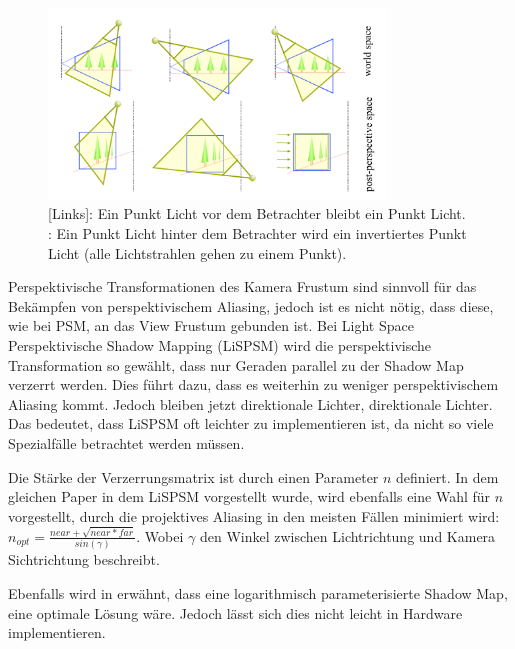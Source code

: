 \begin{figure}
	\begin{center}
    \includegraphics[width=0.8\textwidth]{res/img/psm_point_lights.png}
    \caption{[Links]: Ein Punkt Licht vor dem Betrachter bleibt ein Punkt Licht. \newline
      [Mitte]: Ein Punkt Licht hinter dem Betrachter wird ein
    invertiertes Punkt Licht (alle Lichtstrahlen gehen zu einem Punkt).}
	  \label{fig:psm-point-lights}
	\end{center}
\end{figure}
Perspektivische Transformationen des Kamera Frustum sind sinnvoll für das Bekämpfen von perspektivischem Aliasing,
jedoch ist es nicht nötig, dass diese, wie bei PSM, an das View Frustum gebunden ist.
Bei Light Space Perspektivische Shadow Mapping (LiSPSM) \cite{LiPSM2004} wird die perspektivische Transformation so
gewählt, dass nur Geraden parallel zu der Shadow Map verzerrt werden. 
Dies führt dazu, dass es weiterhin zu weniger perspektivischem Aliasing kommt.
Jedoch bleiben jetzt direktionale Lichter, direktionale Lichter.
Das bedeutet, dass LiSPSM oft leichter zu implementieren ist, da nicht so viele Spezialfälle betrachtet werden müssen.
\par
Die Stärke der Verzerrungsmatrix ist durch einen Parameter $n$ definiert.
In dem gleichen Paper in dem LiSPSM vorgestellt wurde, wird ebenfalls eine Wahl für $n$ vorgestellt,
durch die projektives Aliasing in den meisten Fällen minimiert wird: $ n_{opt} = \frac{near + \sqrt{near * far}}{sin(\gamma)} $. 
Wobei $\gamma{}$ den Winkel zwischen Lichtrichtung und Kamera Sichtrichtung beschreibt.
\par
Ebenfalls wird in \cite{LiPSM2004} erwähnt, dass eine logarithmisch parameterisierte Shadow Map, eine optimale Lösung wäre.
Jedoch lässt sich dies nicht leicht in Hardware implementieren.
